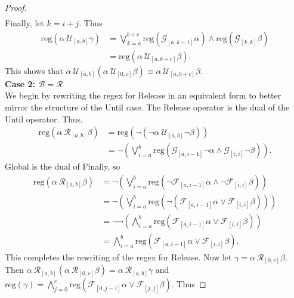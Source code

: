 \documentclass[runningheads]{llncs}
\begin{document}
\begin{proof}
\begin{align*}
\end{align*}
Finally, let $k = i + j$. Thus
\begin{align*}
\text{reg}\left(\alpha \ \mathcal{U}_{[a,b]}\gamma\right) &= \bigvee_{k=a}^{b+c} \text{reg}\left(\mathcal{G}_{[a,k-1]}\alpha\right) \land \text{reg}\left(\mathcal{G}_{[k, k]}\beta  \right) \\
&= \text{reg}\left(\alpha \ \mathcal{U}_{[a,b+c]} \beta\right).
\end{align*}
This shows that $\alpha \ \mathcal{U}_{[a,b]}(\alpha \ \mathcal{U}_{[0,c]} \beta) \equiv \alpha \ \mathcal{U}_{[a,b+c]} \beta$.\\

\noindent \textbf{Case 2: $\mathbf{\mathcal{B} = \mathcal{R}}$} \\
We begin by rewriting the regex for Release in an equivalent form to better mirror the structure of the Until case. The Release operator is the dual of the Until operator. Thus,  \\
\begin{align*}
\text{reg}\left(\alpha \ \mathcal{R}_{[a,b]}\beta\right) &= \text{reg}\left(\neg\left(\neg\alpha \ \mathcal{U}_{[a,b]}\neg\beta\right)\right) \\
&= \neg\left(\bigvee_{i=a}^{b} \text{reg}\left(\mathcal{G}_{[a,i-1]}\neg\alpha \land \mathcal{G}_{[i, i]}\neg\beta\right)\right).
\end{align*}
Global is the dual of Finally, so
\begin{align*}
\text{reg}\left(\alpha \ \mathcal{R}_{[a,b]}\beta\right) &= \neg\left(\bigvee_{i=a}^{b} \text{reg}\left(\neg\mathcal{F}_{[a,i-1]}\alpha \land \neg\mathcal{F}_{[i, i]}\beta\right)\right)\\
&= \neg\left(\bigvee_{i=a}^{b} \text{reg}\left(\neg\left(\mathcal{F}_{[a,i-1]}\alpha \lor \mathcal{F}_{[i, i]}\beta\right)\right)\right)\\
&= \neg\neg\left(\bigwedge_{i=a}^{b} \text{reg}\left(\mathcal{F}_{[a,i-1]}\alpha \lor \mathcal{F}_{[i, i]}\beta\right)\right)\\
&= \bigwedge_{i=a}^{b} \text{reg}\left(\mathcal{F}_{[a,i-1]}\alpha \lor \mathcal{F}_{[i, i]}\beta\right).
\end{align*}
This completes the rewriting of the regex for Release. Now let $\gamma = \alpha \ \mathcal{R}_{[0,c]} \beta$. Then $\alpha \ \mathcal{R}_{[a,b]}(\alpha \ \mathcal{R}_{[0,c]} \beta) = \alpha \ \mathcal{R}_{[a,b]}\gamma$ and
$\text{reg}\left(\gamma\right) = \bigwedge_{j=0}^{c} \text{reg}\left(\mathcal{F}_{[0,j-1]}\alpha \lor \mathcal{F}_{[j, j]}\beta\right)$. Thus

\end{proof}
\end{document}
